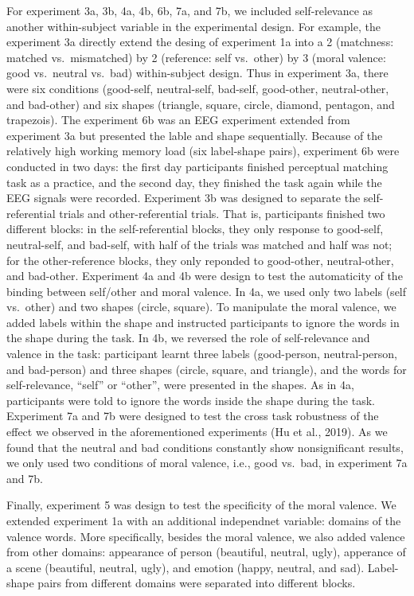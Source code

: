\documentclass[man]{apa6}
\begin{document}
For experiment 3a, 3b, 4a, 4b, 6b, 7a, and 7b, we included self-relevance as another within-subject variable in the experimental design. For example, the experiment 3a directly extend the desing of experiment 1a into a 2 (matchness: matched vs.~mismatched) by 2 (reference: self vs.~other) by 3 (moral valence: good vs.~neutral vs.~bad) within-subject design. Thus in experiment 3a, there were six conditions (good-self, neutral-self, bad-self, good-other, neutral-other, and bad-other) and six shapes (triangle, square, circle, diamond, pentagon, and trapezois). The experiment 6b was an EEG experiment extended from experiment 3a but presented the lable and shape sequentially. Because of the relatively high working memory load (six label-shape pairs), experiment 6b were conducted in two days: the first day participants finished perceptual matching task as a practice, and the second day, they finished the task again while the EEG signals were recorded. Experiment 3b was designed to separate the self-referential trials and other-referential trials. That is, participants finished two different blocks: in the self-referential blocks, they only response to good-self, neutral-self, and bad-self, with half of the trials was matched and half was not; for the other-reference blocks, they only reponded to good-other, neutral-other, and bad-other. Experiment 4a and 4b were design to test the automaticity of the binding between self/other and moral valence. In 4a, we used only two labels (self vs.~other) and two shapes (circle, square). To manipulate the moral valence, we added labels within the shape and instructed participants to ignore the words in the shape during the task. In 4b, we reversed the role of self-relevance and valence in the task: participant learnt three labels (good-person, neutral-person, and bad-person) and three shapes (circle, square, and triangle), and the words for self-relevance, \enquote{self} or \enquote{other}, were presented in the shapes. As in 4a, participants were told to ignore the words inside the shape during the task. Experiment 7a and 7b were designed to test the cross task robustness of the effect we observed in the aforementioned experiments (Hu et al., 2019). As we found that the neutral and bad conditions constantly show nonsignificant results, we only used two conditions of moral valence, i.e., good vs.~bad, in experiment 7a and 7b.

Finally, experiment 5 was design to test the specificity of the moral valence. We extended experiment 1a with an additional independnet variable: domains of the valence words. More specifically, besides the moral valence, we also added valence from other domains: appearance of person (beautiful, neutral, ugly), apperance of a scene (beautiful, neutral, ugly), and emotion (happy, neutral, and sad). Label-shape pairs from different domains were separated into different blocks.
\end{document}
